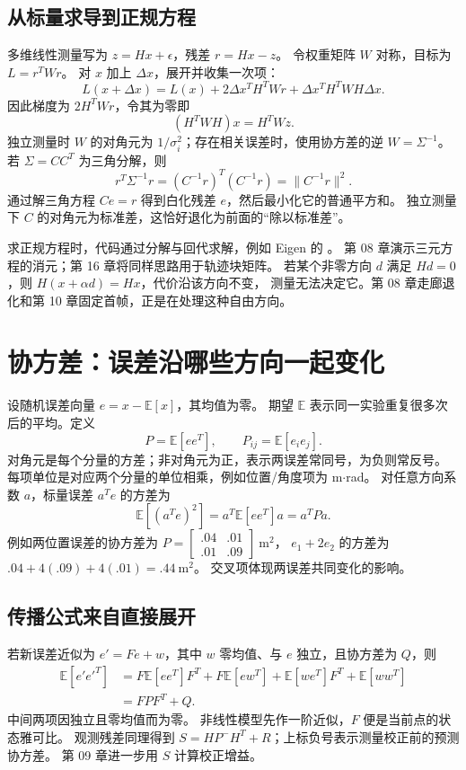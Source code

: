 \subsection{从标量求导到正规方程}
多维线性测量写为 $z=Hx+\epsilon$，残差 $r=Hx-z$。
令权重矩阵 $W$ 对称，目标为 $L=r^TWr$。
对 $x$ 加上 $\Delta x$，展开并收集一次项：
\[
 L(x+\Delta x)=L(x)+2\Delta x^TH^TWr+\Delta x^TH^TWH\Delta x.
\]
因此梯度为 $2H^TWr$，令其为零即
\[
 (H^TWH)x=H^TWz.
\]
独立测量时 $W$ 的对角元为 $1/\sigma_i^2$；存在相关误差时，使用协方差的逆 $W=\Sigma^{-1}$。
若 $\Sigma=CC^T$ 为三角分解，则
\[
 r^T\Sigma^{-1}r=(C^{-1}r)^T(C^{-1}r)=\|C^{-1}r\|^2.
\]
通过解三角方程 $Ce=r$ 得到白化残差 $e$，然后最小化它的普通平方和。
独立测量下 $C$ 的对角元为标准差，这恰好退化为前面的“除以标准差”。

求正规方程时，代码通过分解与回代求解，例如 Eigen 的 。
第 08 章演示三元方程的消元；第 16 章将同样思路用于轨迹块矩阵。
若某个非零方向 $d$ 满足 $Hd=0$，则 $H(x+\alpha d)=Hx$，代价沿该方向不变，
测量无法决定它。第 08 章走廊退化和第 10 章固定首帧，正是在处理这种自由方向。

\section{协方差：误差沿哪些方向一起变化}
设随机误差向量 $e=x-\mathbb E[x]$，其均值为零。
期望 $\mathbb E$ 表示同一实验重复很多次后的平均。定义
\[
 P=\mathbb E[ee^T],\qquad P_{ij}=\mathbb E[e_i e_j].
\]
对角元是每个分量的方差；非对角元为正，表示两误差常同号，为负则常反号。
每项单位是对应两个分量的单位相乘，例如位置/角度项为 m$\cdot$rad。
对任意方向系数 $a$，标量误差 $a^Te$ 的方差为
\[
 \mathbb E[(a^Te)^2]=a^T\mathbb E[ee^T]a=a^TPa.
\]
例如两位置误差的协方差为
$P=\left[\begin{smallmatrix}.04&.01\\.01&.09\end{smallmatrix}\right]\ \mathrm{m^2}$，
$e_1+2e_2$ 的方差为 $.04+4(.09)+4(.01)=.44\ \mathrm{m^2}$。
交叉项体现两误差共同变化的影响。

\subsection{传播公式来自直接展开}
若新误差近似为 $e'=Fe+w$，其中 $w$ 零均值、与 $e$ 独立，且协方差为 $Q$，则
\begin{align*}
 \mathbb E[e'e'^T]
 &=F\mathbb E[ee^T]F^T+F\mathbb E[ew^T]+\mathbb E[we^T]F^T+\mathbb E[ww^T]\\
 &=FPF^T+Q.
\end{align*}
中间两项因独立且零均值而为零。
非线性模型先作一阶近似，$F$ 便是当前点的状态雅可比。
观测残差同理得到 $S=HP^-H^T+R$；上标负号表示测量校正前的预测协方差。
第 09 章进一步用 $S$ 计算校正增益。

